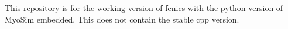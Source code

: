 This repository is for the working version of fenics with the python version of Myo\+Sim embedded. This does not contain the stable cpp version. 